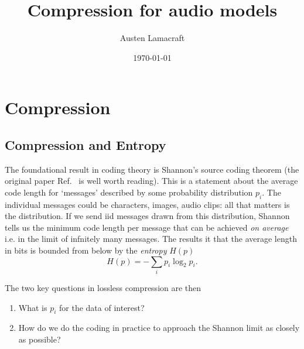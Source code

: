 \documentclass[preprint,notitlepage]{revtex4-1}
\begin{document}
\title{Compression for audio models}
\author{Austen Lamacraft}
\date{\today}

\maketitle
\tableofcontents

\section{Compression}

\subsection{Compression and Entropy}

The foundational result in coding theory is Shannon's source coding theorem (the original paper Ref.~\cite{Shannon:1948aa} is well worth reading).  This is a statement about the average code length for `messages' described by some probability distribution $p_i$. The individual messages could be characters, images, audio clips: all that matters is the distribution. If we send iid messages drawn from this distribution, Shannon tells us the minimum code length per message that can be achieved \emph{on average} i.e. in the limit of infnitely many messages.
The results it that the average length in bits is bounded from below by the \emph{entropy} $H(p)$
%
\begin{equation}
  H(p) = -\sum_i p_i\log_2 p_i.
\end{equation}
%


The two key questions in lossless compression are then

\begin{enumerate}
  \item What is $p_i$ for the data of interest?
  \item How do we do the coding in practice to approach the Shannon limit as closely as possible?
\end{enumerate}
\end{document}
